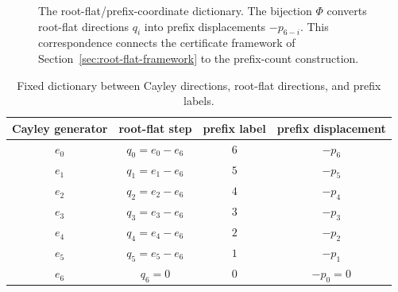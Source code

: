 \documentclass[11pt]{article}
\theoremstyle{definition}
\begin{document}
\begin{figure}[t]
\centering
{}
\caption{The root-flat/prefix-coordinate dictionary. The bijection \(\Phi\) converts root-flat directions \(q_i\) into prefix displacements \(-p_{6-i}\). This correspondence connects the certificate framework of Section~\ref{sec:root-flat-framework} to the prefix-count construction.}
\label{fig:phi-dictionary}
\end{figure}

\begin{table}[t]
\centering
\small
\begin{tabular}{cccc}
\toprule
Cayley generator & root-flat step & prefix label & prefix displacement\\
\midrule
\(e_0\) & \(q_0=e_0-e_6\) & \(6\) & \(-p_6\)\\
\(e_1\) & \(q_1=e_1-e_6\) & \(5\) & \(-p_5\)\\
\(e_2\) & \(q_2=e_2-e_6\) & \(4\) & \(-p_4\)\\
\(e_3\) & \(q_3=e_3-e_6\) & \(3\) & \(-p_3\)\\
\(e_4\) & \(q_4=e_4-e_6\) & \(2\) & \(-p_2\)\\
\(e_5\) & \(q_5=e_5-e_6\) & \(1\) & \(-p_1\)\\
\(e_6\) & \(q_6=0\) & \(0\) & \(-p_0=0\)\\
\bottomrule
\end{tabular}
\caption{Fixed dictionary between Cayley directions, root-flat directions, and prefix labels.}
\label{tab:prefix-dictionary}
\end{table}
\end{document}
